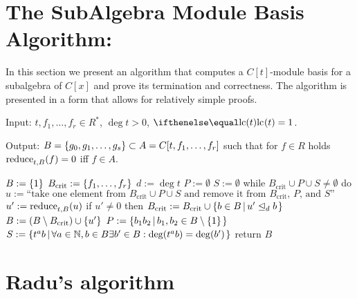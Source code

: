 \documentclass{article}
\begin{document}
\section{The SubAlgebra Module Basis Algorithm:
  \algoSamba{}}%
\label{sec:Algorithm}

In this section we present an algorithm that computes a $C[t]$-module
basis for a subalgebra of $C[x]$ and prove its termination and
correctness. The algorithm \algoSamba{} is presented in a form that
allows for relatively simple proofs.
\medskip

\noindent
Input: $t, f_1, \ldots, f_r \in R^*$, $\deg t > 0$, $\lc t = 1$.

\noindent
Output:
$B = \Set{g_0, g_1, \ldots, g_s} \subset A= C[t, f_1, \ldots, f_r]$
such that for $f\in R$ holds $\applyReduce{f}{t}{B} = 0$ iff
$f \in A$.
\begin{pseudoalgorithm}
$B := \Set{1}$
$B_{\mathrm{crit}} := \Set{f_1, \ldots, f_r}$
$d := \deg t$
$P := \emptyset$
$S := \emptyset$
while $B_{\mathrm{crit}} \cup P \cup S \neq \emptyset$ do
    $u := \textrm{``take one element from }B_{\mathrm{crit}} \cup P \cup S\textrm{ and remove it from }B_{\mathrm{crit}}\textrm{, }P\textrm{, and }S\textrm{''}$
    $u' := \applyReduce{u}{t}{B}$
    if $u' \neq 0$ then
        $B_{\mathrm{crit}} := B_{\mathrm{crit}} \cup \SetDef{b\in B}{\dividesMod[d]{u'}{b}}$
        $B := (B \setminus B_{\mathrm{crit}}) \cup \Set{u'}$
        $P := \SetDef{b_1b_2}{b_1,b_2\in B\setminus\Set{1}}$
        $S := \SetDef{t^ab}{\forall a\in\setN,b\in B \exists b'\in B: \deg(t^ab)=\deg(b')}$
return $B$
\end{pseudoalgorithm}







\section{Radu's algorithm}
\end{document}
